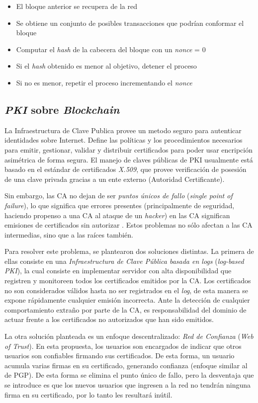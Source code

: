 \begin{itemize}
    \item El bloque anterior se recupera de la red
    \item Se obtiene un conjunto de posibles transacciones que podrían conformar el bloque
    \item Computar el \emph{hash} de la cabecera del bloque con un \emph{nonce} = 0 
    \item Si el \emph{hash} obtenido es menor al objetivo, detener el proceso
    \item Si no es menor, repetir el proceso incrementando el \emph{nonce} 
\end{itemize}

\subsection{\emph{PKI} sobre \emph{Blockchain}}
La Infraestructura de Clave Publica provee un metodo seguro para autenticar identidades sobre Internet. Define las políticas y los procedimientos necesarios para emitir, gestionar, validar y distribuir certificados para poder usar encripción asimétrica de forma segura. El manejo de claves públicas de PKI usualmente está basado en el estándar de certificados \emph{X.509}, que provee verificación de posesión de una clave privada gracias a un ente externo (Autoridad Certificante).

Sin embargo, las CA no dejan de ser \emph{puntos únicos de fallo} (\emph{single point of failure}), lo que significa que errores presentes (principalmente de seguridad, haciendo propenso a una CA al ataque de un \emph{hacker}) en las CA significan emisiones de certificados sin autorizar \autocite{PKICAErrors}. Estos problemas no sólo afectan a las CA intermedias, sino que a las raíces también.

Para resolver este problema, se plantearon dos soluciones distintas. La primera de ellas consiste en una \emph{Infraestructura de Clave Pública basada en logs} (\emph{log-based PKI}), la cual consiste en implementar servidor con alta disponibilidad que registren y monitoreen todos los certificados emitidos por la CA. Los certificados no son considerados válidos hasta no ser registrados en el \emph{log}, de esta manera se expone rápidamente cualquier emisión incorrecta. Ante la detección de cualquier comportamiento extraño por parte de la CA, es responsabilidad del dominio de actuar frente a los certificados no autorizados que han sido emitidos.

La otra solución planteada es un enfoque descentralizado: \emph{Red de Confianza} (\emph{Web of Trust}). En esta propuesta, los usuarios son encargados de indicar que otros usuarios son confiables firmando sus certificados. De esta forma, un usuario acumula varias firmas en su certificado, generando confianza (enfoque similar al de PGP). De esta forma se elimina el punto único de fallo, pero la desventaja que se introduce es que los nuevos usuarios que ingresen a la red no tendrán ninguna firma en su certificado, por lo tanto les resultará inútil.

